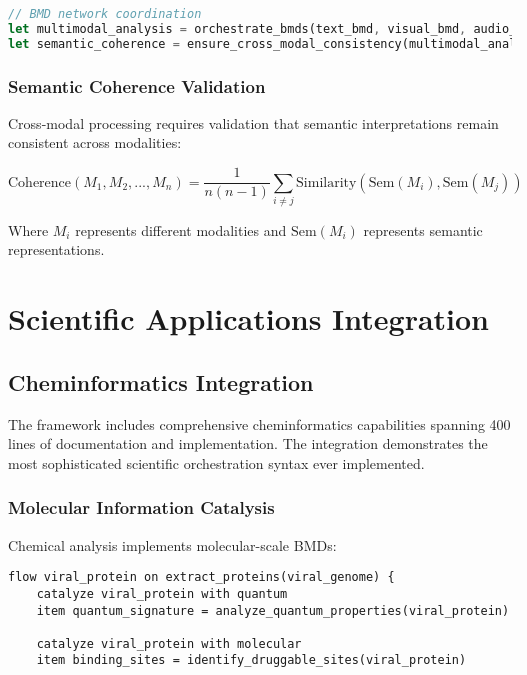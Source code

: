 \documentclass[12pt,a4paper,twoside]{article}
\begin{document}
\begin{itemize}
\begin{lstlisting}[language=rust,caption=Cross-Modal BMD Coordination]
// BMD network coordination
let multimodal_analysis = orchestrate_bmds(text_bmd, visual_bmd, audio_bmd);
let semantic_coherence = ensure_cross_modal_consistency(multimodal_analysis);
\end{lstlisting}

\subsubsection{Semantic Coherence Validation}

Cross-modal processing requires validation that semantic interpretations remain consistent across modalities:

\begin{equation}
\text{Coherence}(M_1, M_2, ..., M_n) = \frac{1}{n(n-1)} \sum_{i \neq j} \text{Similarity}(\text{Sem}(M_i), \text{Sem}(M_j))
\end{equation}

Where $M_i$ represents different modalities and $\text{Sem}(M_i)$ represents semantic representations.

\section{Scientific Applications Integration}

\subsection{Cheminformatics Integration}

The framework includes comprehensive cheminformatics capabilities spanning 400 lines of documentation and implementation. The integration demonstrates the most sophisticated scientific orchestration syntax ever implemented.

\subsubsection{Molecular Information Catalysis}

Chemical analysis implements molecular-scale BMDs:

\begin{lstlisting}[caption=Cheminformatics BMD Operations]
flow viral_protein on extract_proteins(viral_genome) {
    catalyze viral_protein with quantum
    item quantum_signature = analyze_quantum_properties(viral_protein)

    catalyze viral_protein with molecular
    item binding_sites = identify_druggable_sites(viral_protein)


\end{lstlisting}
\end{itemize}
\end{document}
